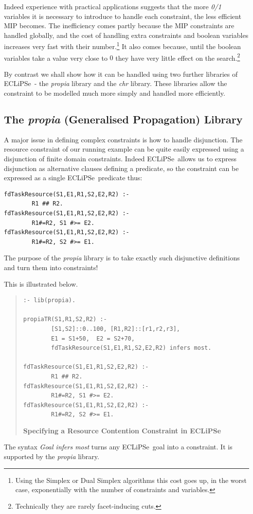 \documentclass[a4wide]{article}
\newcommand{\ECL}{\mbox{ECLiPSe\ }{\hspace{1mm}}}
\begin{document}
Indeed experience with practical applications suggests that the
more {\em 0/1} variables it is necessary to introduce to handle each
constraint, the less
efficient MIP becomes.
The inefficiency comes partly because the MIP constraints are handled
globally, and the cost of handling extra constraints and boolean
variables increases very fast with their number.\footnote{Using the
Simplex or Dual Simplex algorithms this cost goes up, in the worst
case, exponentially with the number of constraints and variables.}
It also comes because, until the boolean variables take a value very
close to $0$ they have very little effect on the
search.\footnote{Technically they are rarely facet-inducing cuts.}

By contrast we shall show how it can be handled using two further
libraries of \ECL - the {\em propia} library and the {\em chr}
library.
These libraries allow the constraint to be modelled much more simply
and handled more efficiently.


\subsection{The {\em propia} (Generalised Propagation) Library}
\label{propia}
A major issue in defining complex constraints is how to handle
disjunction.
The resource constraint of our running example can be quite easily
expressed using a disjunction of finite domain constraints.
Indeed \ECL allows us to express disjunction as alternative clauses
defining a predicate, so the constraint can be expressed as a single
\ECL predicate thus:
\begin{verbatim}
fdTaskResource(S1,E1,R1,S2,E2,R2) :- 
        R1 ## R2.
fdTaskResource(S1,E1,R1,S2,E2,R2) :-
        R1#=R2, S1 #>= E2.
fdTaskResource(S1,E1,R1,S2,E2,R2) :-
        R1#=R2, S2 #>= E1.
\end{verbatim}

The purpose of the {\em propia} library is to take exactly such
disjunctive definitions and turn them into constraints!

This is illustrated below.
\begin{quote}
\begin{verbatim}
:- lib(propia).

propiaTR(S1,R1,S2,R2) :-
        [S1,S2]::0..100, [R1,R2]::[r1,r2,r3],
        E1 = S1+50,  E2 = S2+70,
        fdTaskResource(S1,E1,R1,S2,E2,R2) infers most.

fdTaskResource(S1,E1,R1,S2,E2,R2) :- 
        R1 ## R2.
fdTaskResource(S1,E1,R1,S2,E2,R2) :-
        R1#=R2, S1 #>= E2.
fdTaskResource(S1,E1,R1,S2,E2,R2) :-
        R1#=R2, S2 #>= E1.
\end{verbatim}
{\bf Specifying a Resource Contention Constraint in \ECL}
\label{nolapinfersmost}
\end{quote} 
The syntax {\em Goal infers most} turns any \ECL goal into a constraint.
It is supported by the {\em propia} library.
\end{document}
